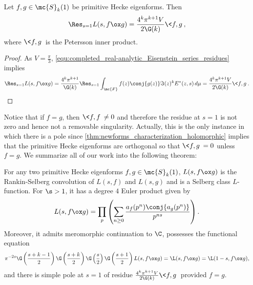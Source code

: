       \begin{proposition}
        Let $f,g \in \mc{S}_{k}(1)$ be primitive Hecke eigenforms. Then
        \[
          \Res_{s = 1}L(s,f \ox g) = \frac{4^{k}\pi^{k+1}V}{2\G(k)}\<f,g\>,
        \]
        where $\<f,g\>$ is the Petersson inner product.
      \end{proposition}
      \begin{proof}
        As $V = \frac{\pi}{3}$, \cref{equ:completed_real-analytic_Eisenstein_series_residues} implies
        \[
          \Res_{s = 1}L(s,f \ox g) = \frac{4^{k}\pi^{k+1}}{\G(k)}\Res_{s = 1}\int_{\mc{F}}f(z)\conj{g(z)}\Im(z)^{k}E^{\ast}(z,s)\,d\mu = \frac{4^{k}\pi^{k+1}V}{2\G(k)}\<f,g\>.
        \]
      \end{proof}

      Notice that if $f = g$, then $\<f,f\> \neq 0$ and therefore the residue at $s = 1$ is not zero and hence not a removable singularity. Actually, this is the only instance in which there is a pole since \cref{thm:newforms_characterization_holomorphic} implies that the primitive Hecke eigenforms are orthogonal so that $\<f,g\> = 0$ unless $f = g$. We summarize all of our work into the following theorem:

      \begin{theorem}
        For any two primitive Hecke eigenforms $f,g \in \mc{S}_{k}(1)$, $L(s,f \ox g)$ is the Rankin-Selberg convolution of $L(s,f)$ and $L(s,g)$ and is a Selberg class $L$-function. For $\s > 1$, it has a degree $4$ Euler product given by
        \[
          L(s,f \ox g) = \prod_{p}\left(\sum_{n \ge 0}\frac{a_{f}(p^{n})\conj{a_{g}(p^{n})}}{p^{ns}}\right).
        \]
        Moreover, it admits meromorphic continuation to $\C$, possesses the functional equation
        \[
          \pi^{-2s}\G\left(\frac{s+k-1}{2}\right)\G\left(\frac{s+k}{2}\right)\G\left(\frac{s}{2}\right)\G\left(\frac{s+1}{2}\right)L(s,f \ox g) = \L(s,f \ox g) = \L(1-s,f \ox g),
        \]
        and there is simple pole at $s = 1$ of residue $\frac{4^{k}\pi^{k+1}V}{2\G(k)}\<f,g\>$ provided $f = g$.
      \end{theorem}
